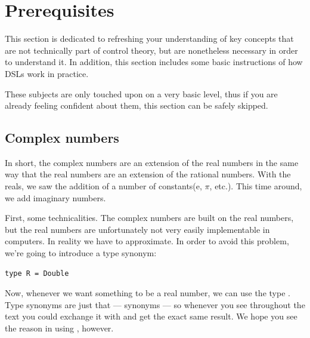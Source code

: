 \graphicspath{ {./Images/} }

\section{Prerequisites}
This section is dedicated to refreshing your understanding of key concepts that are not technically part of control theory, but are nonetheless necessary in order to understand it. In addition, this section includes some basic instructions of how DSLs work in practice.

These subjects are only touched upon on a very basic level, thus if you are already feeling confident about them, this section can be safely skipped.

\subsection{Complex numbers}\label{sec:complex}

In short, the complex numbers are an extension of the real numbers in the same way that the real numbers are an extension of the rational numbers. With the reals, we saw the addition of a number of constants(e, $\pi$, etc.).
This time around, we add imaginary numbers.

First, some technicalities. The complex numbers are built on the real numbers, but the real numbers are unfortunately not very easily implementable in computers. In reality we have to approximate. In order to avoid this problem, we're going to introduce a type synonym: 

\begin{verbatim}
type R = Double 
\end{verbatim}

Now, whenever we want something to be a real number, we can use the type . Type synonyms are just that --- synonyms --- so whenever you see  throughout the text you could exchange it with  and get the exact same result. We hope you see the reason in using , however. 

